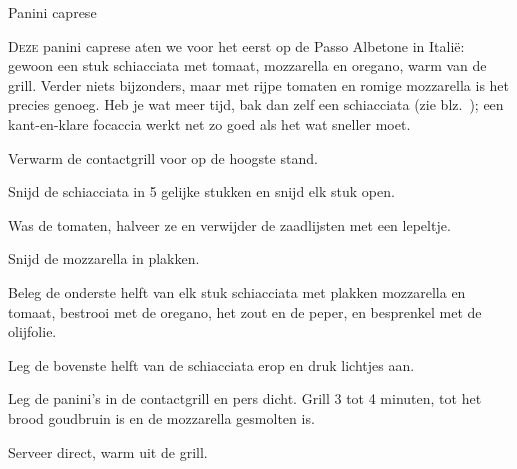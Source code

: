 \begin{recipe}{Panini caprese}
\label{recipe:panini-caprese}


\lettrine{D}{eze} panini caprese aten we voor het eerst op de Passo Albetone in
Italië: gewoon een stuk schiacciata met tomaat, mozzarella en oregano, warm
van de grill. Verder niets bijzonders, maar met rijpe tomaten en romige
mozzarella is het precies genoeg. Heb je wat meer tijd, bak dan zelf een
schiacciata (zie blz.~\pageref{recipe:schiacciata}); een kant-en-klare focaccia
werkt net zo goed als het wat sneller moet.

\begin{ingredients}
\end{ingredients}

\begin{steps}
  \item Verwarm de contactgrill voor op de hoogste stand.
  \item Snijd de schiacciata in 5 gelijke stukken en snijd elk stuk open.
  \item Was de tomaten, halveer ze en verwijder de zaadlijsten met een
        lepeltje.
  \item Snijd de mozzarella in plakken.
  \item Beleg de onderste helft van elk stuk schiacciata met plakken
        mozzarella en tomaat, bestrooi met de oregano, het zout en de peper,
        en besprenkel met de olijfolie.
  \item Leg de bovenste helft van de schiacciata erop en druk lichtjes aan.
  \item Leg de panini's in de contactgrill en pers dicht. Grill 3 tot 4
        minuten, tot het brood goudbruin is en de mozzarella gesmolten is.
  \item Serveer direct, warm uit de grill.
\end{steps}

\end{recipe}
